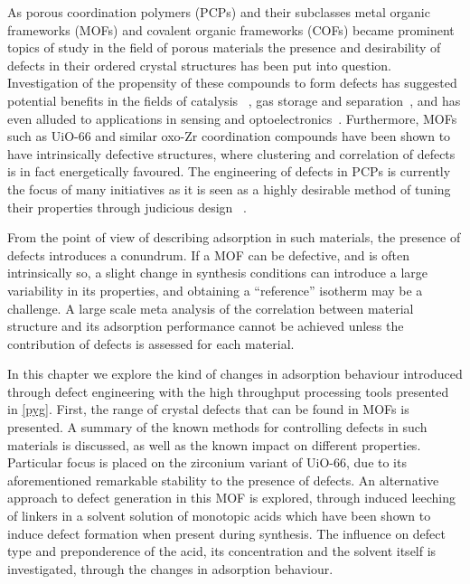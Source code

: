 As porous coordination polymers (PCPs) and their subclasses
metal organic frameworks (MOFs) and covalent organic frameworks (COFs)
became prominent topics of study in the field of porous materials
the presence and desirability of defects in their ordered crystal
structures has been put into question. Investigation of the 
propensity of these compounds to form defects has suggested 
potential benefits in the fields of catalysis
~\cite{caratelliNatureActiveSites2017}, gas storage
and separation~\cite{%
    choiRoleStructuralDefects2018,%
    ghoshWaterAdsorptionUiO662014,%
    liSelectiveGasAdsorption2009%
}, and has even alluded to applications in
sensing and optoelectronics~\cite{cliffeMetalOrganicNanosheets2017}.
Furthermore, MOFs
such as UiO-66 and similar oxo-Zr coordination compounds have been 
shown to have intrinsically defective structures, where clustering 
and correlation of defects~\cite{cliffeCorrelatedDefectNanoregions2014}
is in fact energetically favoured.
The engineering of defects in PCPs is currently the focus of many
initiatives as it is seen as a highly desirable method of tuning 
their properties through judicious design
~\cite{
    shollDefectsMetalOrganic2015,%
    bennettInterplayDefectsDisorder2016,%
    liangLinkingDefectsHierarchical2018%
}.

From the point of view of describing adsorption in 
such materials, the presence of defects introduces a conundrum.
If a MOF can be defective, and is often intrinsically so,
a slight change in synthesis conditions can introduce a 
large variability in its properties, and obtaining a 
``reference'' isotherm may be a challenge. A large scale
meta analysis of the correlation between material structure
and its adsorption performance cannot be achieved unless
the contribution of defects is assessed for each material.

In this chapter we explore the kind of changes in 
adsorption behaviour introduced through defect engineering with 
the high throughput processing tools presented in \autoref{pyg}.
First, the range of crystal defects that can be found in MOFs 
is presented. A summary of the known methods for controlling defects in
such materials is discussed, as well as the known impact on 
different properties.
Particular focus is placed on the zirconium variant of UiO-66,
due to its aforementioned remarkable stability to the presence of defects.
An alternative approach to defect generation in this MOF is explored,
through induced leeching of linkers in a solvent solution of monotopic
acids which have been shown to induce defect formation when present
during synthesis. The influence on defect type and preponderence 
of the acid, its concentration and 
the solvent itself is investigated, through the changes in 
adsorption behaviour.

